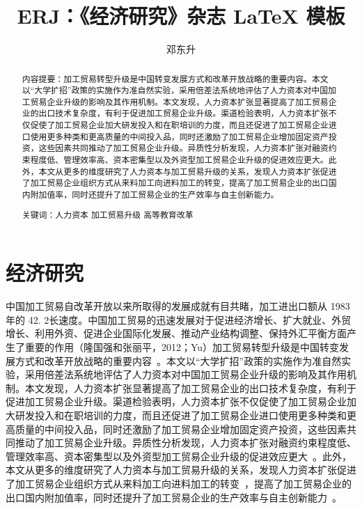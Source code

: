 \documentclass[10pt]{ERJ}
\title{ERJ：《经济研究》杂志 \LaTeX{} 模板}
\author{邓东升}
\date{}
\begin{document}
\maketitle

\begin{abstract}
\par 内容提要：加工贸易转型升级是中国转变发展方式和改革开放战略的重要内容。本文以“大学扩招”政策的实施作为准自然实验，采用倍差法系统地评估了人力资本对中国加工贸易企业升级的影响及其作用机制。本文发现，人力资本扩张显著提高了加工贸易企业的出口技术复杂度，有利于促进加工贸易企业升级。渠道检验表明，人力资本扩张不仅促使了加工贸易企业加大研发投入和在职培训的力度，而且还促进了加工贸易企业进口使用更多种类和更高质量的中间投入品，同时还激励了加工贸易企业增加固定资产投资，这些因素共同推动了加工贸易企业升级。异质性分析发现，人力资本扩张对融资约束程度低、管理效率高、资本密集型以及外资型加工贸易企业升级的促进效应更大。此外，本文从更多的维度研究了人力资本与加工贸易升级的关系，发现人力资本扩张促进了加工贸易企业组织方式从来料加工向进料加工的转变，提高了加工贸易企业的出口国内附加值率，同时还提升了加工贸易企业的生产效率与自主创新能力。\par
关键词：人力资本 加工贸易升级 高等教育改革
\end{abstract}


\section{经济研究}
中国加工贸易自改革开放以来所取得的发展成就有目共睹，加工进出口额从 1983 年的 42. 2长速度。中国加工贸易的迅速发展对于促进经济增长、扩大就业、外贸增长、利用外资、促进企业国际化发展、推动产业结构调整、保持外汇平衡方面产生了重要的作用（隆国强和张丽平，2012；Yu）加工贸易转型升级是中国转变发展方式和改革开放战略的重要内容~\cite{约翰1978--}。本文以“大学扩招”政策的实施作为准自然实验，采用倍差法系统地评估了人力资本对中国加工贸易企业升级的影响及其作用机制。本文发现，人力资本扩张显著提高了加工贸易企业的出口技术复杂度，有利于促进加工贸易企业升级。渠道检验表明，人力资本扩张不仅促使了加工贸易企业加大研发投入和在职培训的力度，而且还促进了加工贸易企业进口使用更多种类和更高质量的中间投入品，同时还激励了加工贸易企业增加固定资产投资，这些因素共同推动了加工贸易企业升级。异质性分析发现，人力资本扩张对融资约束程度低、管理效率高、资本密集型以及外资型加工贸易企业升级的促进效应更大~\cite{John1978--}。此外，本文从更多的维度研究了人力资本与加工贸易升级的关系，发现人力资本扩张促进了加工贸易企业组织方式从来料加工向进料加工的转变~\cite{李四1991--}，提高了加工贸易企业的出口国内附加值率，同时还提升了加工贸易企业的生产效率与自主创新能力~\cite{Carlson2000}。



 \printbibliography
\end{document}
